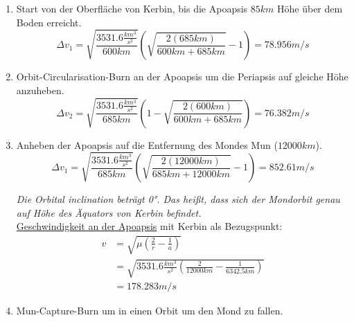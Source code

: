 \documentclass[12pt,paper=A4,numbers=noenddot,bibliography=totoc,listof=totoc,DIV=11,BCOR=1mm]{scrreprt}
\newcommand{\gq}[1]{\glqq #1\grqq} %
\begin{document}
\begin{enumerate}
\item Start von der Oberfläche von Kerbin, bis die Apoapsis $85km$ Höhe über dem Boden erreicht.
\begin{equation*}
\Delta v_{1} = \sqrt{\frac{3531.6 \frac{km^{3}}{s^{2}}}{600km}} \left( \sqrt{\frac{2(685km)}{600km+685km}}-1 \right)      = 78.956 m/s
\end{equation*}
\item Orbit-Circularisation-Burn an der Apoapsis um die Periapsis auf gleiche Höhe anzuheben.
\begin{equation*}
\Delta v_{2} = \sqrt{\frac{3531.6 \frac{km^{3}}{s^{2}}}{685km}} \left( 1-\sqrt{\frac{2(600km)}{600km+685km}} \right)      = 76.382 m/s
\end{equation*}
\item Anheben der Apoapsis auf die Entfernung des Mondes Mun ($12000km$).\\
\begin{equation*}
\Delta v_{1} = \sqrt{\frac{3531.6 \frac{km^{3}}{s^{2}}}{685km}} \left( \sqrt{\frac{2(12000km)}{685km+12000km}}-1 \right) = 852.61 m/s
\end{equation*}

\emph{Die \gq{Orbital inclination} beträgt 0°. Das heißt, dass sich der Mondorbit genau auf Höhe des Äquators von Kerbin befindet.}\\

\hyperlink{velocityatorbitposition}{Geschwindigkeit an der Apoapsis} mit Kerbin als Bezugspunkt:
\begin{equation*}\label{eq:velatorbitpos} 
\begin{split}
v &= \sqrt{\mu \left( \frac{2}{r} - \frac{1}{a} \right) } \\
  &= \sqrt{3531.6 \frac{km^{3}}{s^{2}} \left( \frac{2}{12000km} - \frac{1}{6342.5km} \right) } \\
  &= 178.283m/s
\end{split}
\end{equation*}

\item Mun-Capture-Burn um in einen Orbit um den Mond zu fallen.\\


\end{enumerate}
\end{document}
